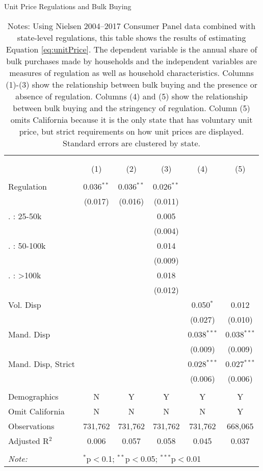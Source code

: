 \begin{table}[!htbp] \centering
  \caption{Unit Price Regulations and Bulk Buying}
  \label{tab:unitPriceLaw}
\begin{tabular}{@{\extracolsep{5pt}}lccccc}
\\[-1.8ex]\hline
\hline \\[-1.8ex]
\\[-1.8ex] & (1) & (2) & (3) & (4) & (5)\\
\hline \\[-1.8ex]
 Regulation & 0.036$^{**}$ & 0.036$^{**}$ & 0.026$^{**}$ &  &  \\
  & (0.017) & (0.016) & (0.011) &  &  \\
   . : 25-50k &  &  & 0.005 &  &  \\
  &  &  & (0.004) &  &  \\
   . : 50-100k &  &  & 0.014 &  &  \\
  &  &  & (0.009) &  &  \\
   . : >100k &  &  & 0.018 &  &  \\
  &  &  & (0.012) &  &  \\
  Vol. Disp &  &  &  & 0.050$^{*}$ & 0.012 \\
  &  &  &  & (0.027) & (0.010) \\
  Mand. Disp &  &  &  & 0.038$^{***}$ & 0.038$^{***}$ \\
  &  &  &  & (0.009) & (0.009) \\
  Mand. Disp, Strict &  &  &  & 0.028$^{***}$ & 0.027$^{***}$ \\
  &  &  &  & (0.006) & (0.006) \\
 \hline \\[-1.8ex]
Demographics & N & Y & Y & Y & Y \\
Omit California & N & N & N & N & Y \\
Observations & 731,762 & 731,762 & 731,762 & 731,762 & 668,065 \\
Adjusted R$^{2}$ & 0.006 & 0.057 & 0.058 & 0.045 & 0.037 \\
\hline
\hline \\[-1.8ex]
\textit{Note:}  & \multicolumn{5}{l}{$^{*}$p$<$0.1; $^{**}$p$<$0.05; $^{***}$p$<$0.01} \\
\end{tabular}
\caption*{Notes: Using Nielsen 2004--2017 Consumer Panel data combined with state-level regulations, this table shows the results of estimating Equation \ref{eq:unitPrice}. The dependent variable is the annual share of bulk purchases made by households and the independent variables are measures of regulation as well as household characteristics. Columns (1)-(3) show the relationship between bulk buying and the presence or absence of regulation. Columns (4) and (5) show the relationship between bulk buying and the stringency of regulation. Column (5) omits California because it is the only state that has voluntary unit price, but strict requirements on how unit prices are displayed. Standard errors are clustered by state.}
\end{table}
